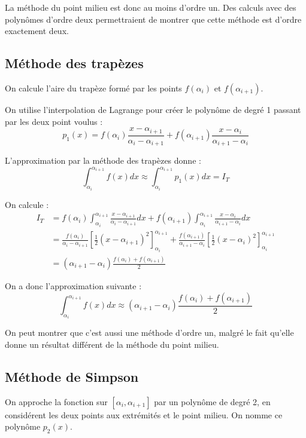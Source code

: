 \documentclass{article}
\begin{document}
La méthode du point milieu est donc au moins d'ordre un. Des calculs avec des polynômes d'ordre deux permettraient de montrer que cette méthode est d'ordre exactement deux.

\subsection{Méthode des trapèzes}
On calcule l'aire du trapèze formé par les points $f(\alpha_i)$ et $f(\alpha_{i+1})$.

On utilise l'interpolation de Lagrange pour créer le polynôme de degré 1 passant par les deux point voulus : \[
    p_1(x) = f(\alpha_i)\frac{x - \alpha_{i+1}}{\alpha_i-\alpha_{i+1}} + f(\alpha_{i+1})\frac{x - \alpha_i}{\alpha_{i+1} - \alpha_i}
\]

L'approximation par la méthode des trapèzes donne : \[
    \int_{\alpha_i}^{\alpha_{i+1}} f(x)dx \approx \int_{\alpha_i}^{\alpha_{i+1}} p_1(x)dx = I_T
\]

On calcule : \[ \begin{aligned}
        I_T & = f(\alpha_i)\int_{\alpha_i}^{\alpha_{i+1}}\frac{x - \alpha_{i+1}}{\alpha_i-\alpha_{i+1}}dx + f(\alpha_{i+1})\int_{\alpha_i}^{\alpha_{i+1}}\frac{x - \alpha_i}{\alpha_{i+1} - \alpha_i}dx \\
            & = \frac{f(\alpha_i)}{\alpha_i - \alpha_{i+1}}\left[\frac{1}{2}(x - \alpha_{i+1})^2\right]_{\alpha_i}^{\alpha_{i+1}} + \frac{f(\alpha_{i+1})}{\alpha_{i+1} - \alpha_i}\left[\frac{1}{2}(x-\alpha_i)^2\right]_{\alpha_i}^{\alpha_{i+1}} \\
            & = (\alpha_{i+1} - \alpha_i)\frac{f(\alpha_i) + f(\alpha_{i+1})}{2}
    \end{aligned}
\]

On a donc l'approximation suivante : \begin{equation}
    \int_{\alpha_i}^{\alpha_{i+1}} f(x)dx \approx (\alpha_{i+1} - \alpha_i)\frac{f(\alpha_i) + f(\alpha_{i+1})}{2}
\end{equation}

On peut montrer que c'est aussi une méthode d'ordre un, malgré le fait qu'elle donne un résultat différent de la méthode du point milieu.

\subsection{Méthode de Simpson}
On approche la fonction sur $[\alpha_i, \alpha_{i+1}]$ par un polynôme de degré 2, en considérent les deux points aux extrémités et le point milieu. On nomme ce polynôme $p_2(x)$.
\end{document}
